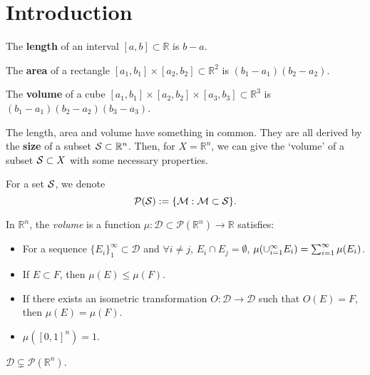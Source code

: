 \section{Introduction}
\begin{exm}
    The \textbf{length} of an interval 
    $[a,b]\subset\mathbb{R}$ is $b-a$.
\end{exm}
\begin{exm}
    The \textbf{area} of a rectangle 
    $[a_1,b_1]\times [a_2,b_{2}]\subset\mathbb{R}^{2}$ 
    is $(b_1-a_1)(b_2-a_2)$.
\end{exm}
\begin{exm}
    The \textbf{volume} of a cube 
    $[a_1,b_1]\times [a_2,b_2]\times [a_3,b_3]\subset\mathbb{R}^3$ 
    is $(b_1-a_1)(b_2-a_2)(b_3-a_3)$.
\end{exm}
\begin{rem}
    The length, area and volume have something in common. 
    They are all derived by the \textbf{size} of 
    a subset $\mathcal{S}\subset\mathbb{R}^{n}$. 
    Then, for $X=\mathbb{R}^n$, we can give the `volume' 
    of a subset $\mathcal{S}\subset X$ with some necessary properties.  
\end{rem}
\begin{ntn}
    For a set $\mathcal{S}$, we denote 
    \begin{displaymath}
        \mathcal{P}(\mathcal{S}):=\{\mathcal{M}:\mathcal{M}\subset\mathcal{S}\}.
    \end{displaymath}
\end{ntn}
\begin{defn}
    \label{Defn:volume}
    In $\mathbb{R}^{n}$, the \textit{volume} is a function 
    $\mu:\mathcal{D}\subset 
    \mathcal{P}(\mathbb{R}^{n})\rightarrow\mathbb{R}$ satisfies:
    \begin{itemize}
        \item For a sequence $\{E_{i}\}_1^{\infty}\subset\mathcal{D}$ 
        and $\forall i\neq j$, $E_i\cap E_{j}=\emptyset$, 
        $\mu(\cup_{i=1}^{\infty}E_{i})=\sum_{i=1}^{\infty}\mu(E_i)$.
        \item If $E\subset F$, then $\mu(E)\le\mu(F)$.
        \item If there exists an isometric transformation 
        $O:\mathcal{D}\rightarrow\mathcal{D}$ such that $O(E)=F$, 
        then $\mu(E)=\mu(F)$.
        \item $\mu([0,1]^{n})=1$.
    \end{itemize}
\end{defn}
\begin{thm}
    \label{Thm:NotMeasurableSet}
    $\mathcal{D}\subsetneq\mathcal{P}(\mathbb{R}^{n})$.
\end{thm}
